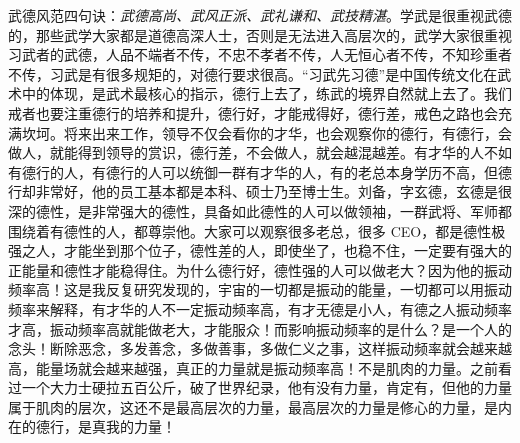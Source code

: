武德风范四句诀：\textit{武德高尚、武风正派、武礼谦和、武技精湛}。学武是很重视武德的，那些武学大家都是道德高深人士，否则是无法进入高层次的，武学大家很重视习武者的武德，人品不端者不传，不忠不孝者不传，人无恒心者不传，不知珍重者不传，习武是有很多规矩的，对德行要求很高。“习武先习德”是中国传统文化在武术中的体现，是武术最核心的指示，德行上去了，练武的境界自然就上去了。我们戒者也要注重德行的培养和提升，德行好，才能戒得好，德行差，戒色之路也会充满坎坷。将来出来工作，领导不仅会看你的才华，也会观察你的德行，有德行，会做人，就能得到领导的赏识，德行差，不会做人，就会越混越差。有才华的人不如有德行的人，有德行的人可以统御一群有才华的人，有的老总本身学历不高，但德行却非常好，他的员工基本都是本科、硕士乃至博士生。刘备，字玄德，玄德是很深的德性，是非常强大的德性，具备如此德性的人可以做领袖，一群武将、军师都围绕着有德性的人，都尊崇他。大家可以观察很多老总，很多 CEO，都是德性极强之人，才能坐到那个位子，德性差的人，即使坐了，也稳不住，一定要有强大的正能量和德性才能稳得住。为什么德行好，德性强的人可以做老大？因为他的振动频率高！这是我反复研究发现的，宇宙的一切都是振动的能量，一切都可以用振动频率来解释，有才华的人不一定振动频率高，有才无德是小人，有德之人振动频率才高，振动频率高就能做老大，才能服众！而影响振动频率的是什么？是一个人的念头！断除恶念，多发善念，多做善事，多做仁义之事，这样振动频率就会越来越高，能量场就会越来越强，真正的力量就是振动频率高！不是肌肉的力量。之前看过一个大力士硬拉五百公斤，破了世界纪录，他有没有力量，肯定有，但他的力量属于肌肉的层次，这还不是最高层次的力量，最高层次的力量是修心的力量，是内在的德行，是真我的力量！

